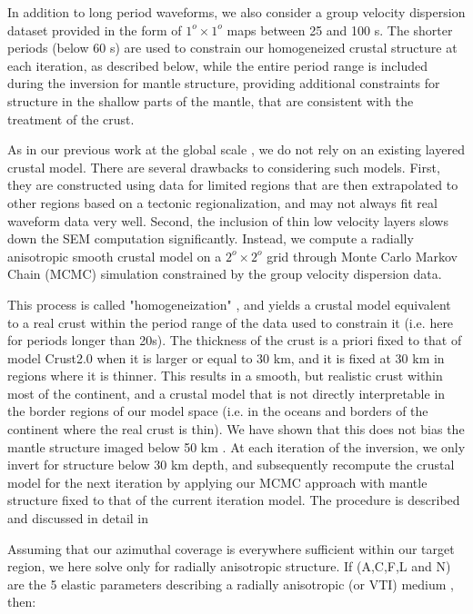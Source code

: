 \documentclass[12pt]{article}
\begin{document}
In addition to long period waveforms, we also consider a group velocity dispersion dataset \citep{shapiro2002monte} provided in the form of $1^o \times 1^o $ maps between 25 and 100 s. 
The shorter periods (below 60 s) are used to constrain our homogeneized crustal structure at each iteration, as described below, while the entire period range is included during the inversion for mantle structure, providing additional constraints for structure in the shallow parts of the mantle, that are consistent with the treatment of the crust.

As in our previous work at the global scale \citep{french2013waveform,french2014whole}, we do not rely on an existing layered crustal model. 
There are several drawbacks to considering such models. 
First, they are constructed using data for limited regions that are then extrapolated to other regions based on a tectonic regionalization, and may not always fit real waveform data very well. 
Second, the inclusion of thin low velocity layers slows down the SEM computation significantly. 
Instead, we compute a radially anisotropic smooth crustal model on a $2^o \times 2^o $ grid through Monte Carlo Markov Chain (MCMC) simulation constrained by the group velocity dispersion data. 

This process is called "homogeneization" \citep[e.g.][]{backus1962long,capdeville2008shallow}, and yields a crustal model equivalent to a real crust within the period range of the data used to constrain it (i.e. here for periods longer than 20s). 
The thickness of the crust is a priori fixed to that of model Crust2.0 \citep{basscrust2} when it is larger or equal to 30 km, and it is fixed at 30 km in regions where it is thinner. 
This results in a smooth, but realistic crust within most of the continent, and a crustal model that is not directly interpretable in the border regions of our model space (i.e. in the oceans and borders of the continent where the real crust is thin). 
We have shown that this does not bias the mantle structure imaged below 50 km \citep{french2014whole}. 
At each iteration of the inversion, we only invert for structure below 30 km depth, and subsequently recompute the crustal model for the next iteration by applying our MCMC approach with mantle structure fixed to that of the current iteration model. 
The procedure is described and discussed in detail in \cite{french2014whole}

Assuming that our azimuthal coverage is everywhere sufficient within our target region, we here solve only for radially anisotropic structure. If (A,C,F,L and N) are the 5 elastic parameters describing a radially anisotropic (or VTI) medium \citep{love2013treatise}, then:
\end{document}
